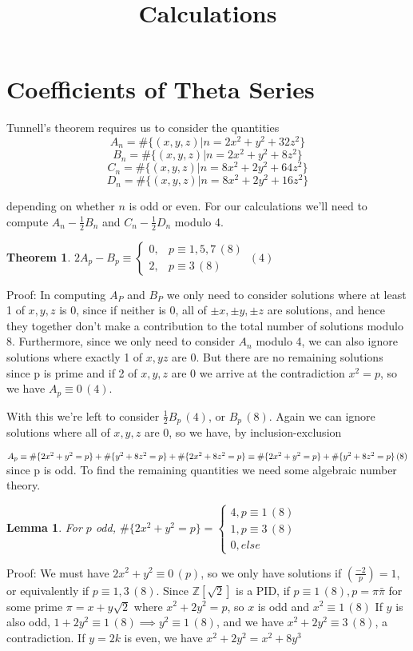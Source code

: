 \documentclass[11pt,a4paper]{amsart}
\title[Latex Template]{Calculations}
\theoremstyle{plain}
\newtheorem{thm}[prop]{Theorem}
\newtheorem{lemma}[prop]{Lemma}
\theoremstyle{definition}
\theoremstyle{remark}
\numberwithin{equation}{section}
\newcommand{\ZZ}{{\mathbb Z}}
\newcommand{\1}{{\mathds 1}}
\begin{document}
\section{Coefficients of Theta Series}
Tunnell's theorem requires us to consider the quantities 
\[  A_n = \#\{(x,y,z) | n = 2x^2 + y^2 + 32z^2\} \]
\[  B_n = \#\{(x,y,z) | n = 2x^2 + y^2 + 8z^2\} \]
\[  C_n = \#\{(x,y,z) | n = 8x^2 + 2y^2 + 64z^2\} \]
\[  D_n = \#\{(x,y,z) | n = 8x^2 + 2y^2 + 16z^2\} \]

depending on whether $n$ is odd or even. For our calculations we'll
need to compute $A_n - \frac{1}{2}B_n$ and $C_n - \frac{1}{2}D_n$ modulo 4.

\begin{thm}
  $2A_p - B_p \equiv \begin{cases} 0, & p \equiv 1, 5, 7 \, (8) \\
    2, & p \equiv 3 \, (8) \end{cases}
  \, (4)$
\end{thm}
Proof: In computing $A_P$ and $B_P$ we only need to consider solutions
where at least 1 of $x, y, z$ is 0, since if neither is 0, all of $\pm x, \pm y, \pm z$
are solutions, and hence they together don't make a contribution to the total
number of solutions modulo 8. Furthermore, since we only need to consider $A_n$
modulo 4, we can also ignore solutions where exactly 1 of $x, y z$ are 0. But
there are no remaining solutions since p is prime and if 2 of $x, y, z$ are 0 we
arrive at the contradiction $x^2 = p$, so we have $A_p \equiv 0 \, (4)$.

With this we're left to consider $\frac{1}{2}B_p \, (4)$, or $B_p \, (8)$. Again we can
ignore solutions where all of $x, y, z$ are 0, so we have, by inclusion-exclusion

\( A_p \equiv \#\{ 2x^2 + y^2 = p\} + \#\{y^2 + 8z^2 = p\} + \#\{2x^2 + 8z^2 = p\} \\
\equiv \#\{ 2x^2 + y^2 = p\} + \#\{y^2 + 8z^2 = p\} \, (8)\)
since p is odd. To find the remaining quantities we need some algebraic number
theory.

\begin{lemma}
  For $p$ odd, $\#\{2x^2 + y^2 = p\} = \begin{cases} 4,
    p \equiv 1 \, (8) \\
    1, p \equiv 3 \, (8) \\
    0, else \end{cases}$
\end{lemma}
Proof: We must have $2x^2 + y^2 \equiv 0 \, (p)$, so we only have solutions if
$(\frac{-2}{p}) = 1$, or equivalently if $p \equiv 1, 3 \, (8)$. Since
$\ZZ[\sqrt{2}]$ is a PID, if $p \equiv 1 \, (8), p = \pi \bar{\pi}$ for some
prime $\pi = x + y \sqrt{2}$ where $x^2 + 2y^2 = p$, so $x$ is odd and $x^2
\equiv 1 \, (8)$
If $y$ is also odd, $1 + 2y^2 \equiv 1 \, (8) \implies y^2 \equiv 1 \, (8)$, and
we have $x^2 + 2y^2 \equiv 3 \, (8)$, a contradiction.
If $y = 2k$ is even, we have $x^2 + 2y^2 = x^2 + 8y^3$ 
\end{document}
